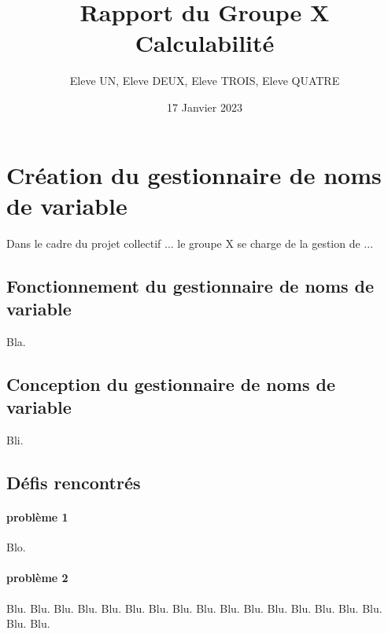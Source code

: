 \documentclass[12pt]{article}
\begin{document}

\title{\textbf{Rapport du Groupe X}\\ \vspace*{.5\baselineskip} Calculabilité}
\author{Eleve UN, Eleve DEUX, Eleve TROIS, Eleve QUATRE}
\date{17 Janvier 2023}

\maketitle

\newpage

\section{Création du gestionnaire de noms de variable}
Dans le cadre du projet collectif ... le groupe X se charge de la gestion de ...

\subsection{Fonctionnement du gestionnaire de noms de variable}
Bla.

\subsection{Conception du gestionnaire de noms de variable}
Bli.

\subsection{Défis rencontrés} %

\paragraph{problème 1 \\}
Blo.

\paragraph{problème 2}
Blu. Blu. Blu. Blu. Blu. Blu. Blu. Blu. Blu. Blu. Blu. Blu. Blu. Blu. Blu. Blu. Blu. Blu. 

\end{document}

